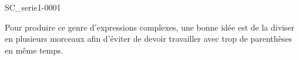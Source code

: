 \begin{corrige}{SC_serie1-0001}

	Pour produire ce genre d'expressions complexes, une bonne idée est de la diviser en plusieurs morceaux afin d'éviter de devoir travailler avec trop de parenthèses en même temps.



\end{corrige}
